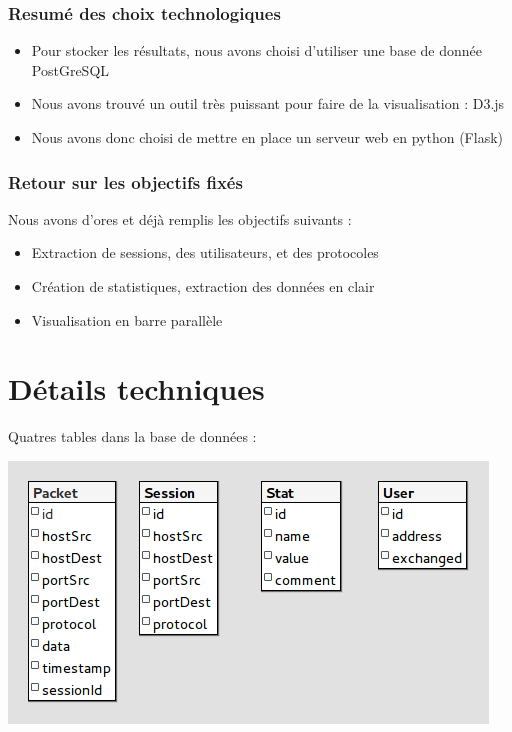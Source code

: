 \documentclass{beamer}
\begin{document}
  \begin{frame}
  \frametitle{Resumé des choix technologiques}
   \begin{itemize}
    \item Pour stocker les résultats, nous avons choisi d'utiliser une base de donnée PostGreSQL
    \item Nous avons trouvé un outil très puissant pour faire de la visualisation : D3.js
    \item Nous avons donc choisi de mettre en place un serveur web en python (Flask)
   \end{itemize}
  \end{frame}
  
  \begin{frame}
  \frametitle{Retour sur les objectifs fixés}
    Nous avons d'ores et déjà remplis les objectifs suivants :
    \begin{itemize}
     \item Extraction de sessions, des utilisateurs, et des protocoles
     \item Création de statistiques, extraction des données en clair
     \item Visualisation en barre parallèle
    \end{itemize}
  \end{frame}
  
  \section{Détails techniques}
  \begin{frame}
   Quatres tables dans la base de données :
   \begin{center}
    \includegraphics[scale=0.6]{postgre.png}
   \end{center}
  \end{frame}
  
\end{document}
